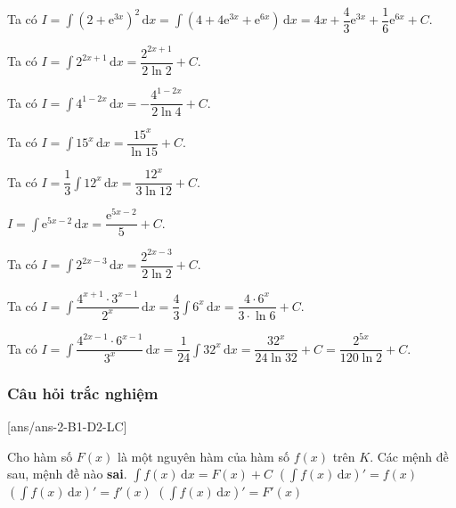 \begin{vd}
{\begin{listEX}[1]
            \item Ta có $I=\displaystyle\int \left(2+\mathrm{e}^{3x}\right)^2 \mathrm{\,d}x= \displaystyle\int \left(4+4\mathrm{e}^{3x}+ \mathrm{e}^{6x}\right) \mathrm{\,d}x=4x+\dfrac{4}{3}\mathrm{e}^{3x}+\dfrac{1}{6}\mathrm{e}^{6x}+C$.
            \item Ta có $I=\displaystyle\int 2^{2x+1} \mathrm{\,d}x=\dfrac{2^{2x+1}}{2\ln 2}+C$.
            \item Ta có $I=\displaystyle\int 4^{1-2x} \mathrm{\,d}x=-\dfrac{4^{1-2x}}{2\ln 4}+C$.
            \item Ta có $I=\displaystyle\int 15^x \mathrm{\,d}x = \dfrac{15^x}{\ln 15}+C$.
            \item Ta có $I=\dfrac{1}{3}\displaystyle\int 12^x \mathrm{\,d}x=\dfrac{12^x}{3\ln 12}+C$.
            \item $I=\displaystyle\int \mathrm{e}^{5x-2}\mathrm{\,d}x=\dfrac{\mathrm{e}^{5x-2}}{5}+C$.
            \item Ta có $I=\displaystyle\int 2^{2x-3} \mathrm{\,d}x =\dfrac{ 2^{2x-3}}{2\ln 2}+C$.
            \item Ta có $I=\displaystyle\int \dfrac{4^{x+1} \cdot 3^{x-1}}{2^x} \mathrm{\,d}x=\dfrac{4}{3}\displaystyle\int 6^x\mathrm{\,d}x= \dfrac{4\cdot 6^x}{3\cdot \ln 6}+C$.
            \item Ta có $I=\displaystyle\int \dfrac{4^{2x-1} \cdot 6^{x-1}}{3^x} \mathrm{\,d}x=\dfrac{1}{24}\displaystyle\int 32^x \mathrm{\,d}x=\dfrac{32^x}{24\ln 32}+C=\dfrac{2^{5x}}{120\ln 2}+C$.
        \end{listEX}
    }
\end{vd}
\subsubsection{Câu hỏi trắc nghiệm}
{}[ans/ans-2-B1-D2-LC]
\begin{ex}%
	Cho hàm số $F(x)$ là một nguyên hàm của hàm số $f(x)$ trên $K$. Các mệnh đề sau, mệnh đề nào \textbf{sai}.
	\choice
	{$\displaystyle\int{f(x)\mathrm{\,d}x=}F(x)+C$}
	{$\displaystyle{\left(\displaystyle\int{f(x)\mathrm{\,d}x}\right)'}=f(x)$}
	{\True $\displaystyle{\left(\displaystyle\int{f(x)\mathrm{\,d}x}\right)'}=f'(x)$}
	{$\displaystyle{\left(\displaystyle\int{f(x)\mathrm{\,d}x}\right)'}=F'(x)$}
\end{ex}

